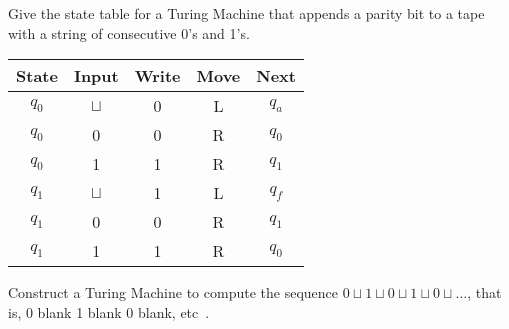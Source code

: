 \documentclass[addpoints,12pt]{exam}
\begin{document}
\begin{questions}
\begin{solution}
\end{solution}


\question
Give the state table for a Turing Machine that appends a parity bit to a tape with a string of consecutive 0's and 1's.

\begin{solution}
\begin{table}[H]
  \centering
  \begin{tabular}{ccccc}
    \toprule
        State & Input & Write & Move & Next \\
    \midrule
        $q_0$ & $\sqcup$ & 0 & L & $q_a$ \\
        $q_0$ & 0 & 0 & R & $q_0$ \\
        $q_0$ & 1 & 1 & R & $q_1$ \\
    \midrule
        $q_1$ & $\sqcup$ & 1 & L & $q_f$ \\
        $q_1$ & 0 & 0 & R & $q_1$ \\
        $q_1$ & 1 & 1 & R & $q_0$ \\
    \bottomrule
    \hline
  \end{tabular}
\end{table}
\end{solution}

\question
Construct a Turing Machine to compute the sequence $0 \sqcup 1 \sqcup 0 \sqcup 1 \sqcup 0 \sqcup \ldots$, that is, 0 blank 1 blank 0 blank, etc~\cite{turing37}.


\end{questions}
\end{document}
